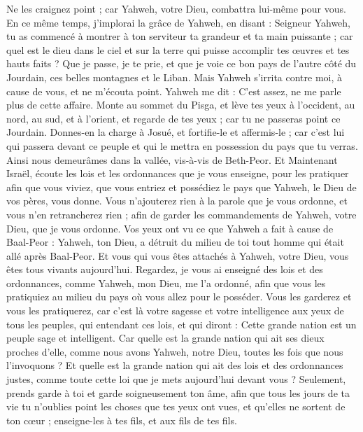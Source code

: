 \begin{multicols}{2}
Ne les craignez point ; car Yahweh, votre Dieu, combattra lui-même pour vous.
En ce même temps, j’implorai la grâce de Yahweh, en disant :
Seigneur Yahweh, tu as commencé à montrer à ton serviteur ta grandeur et ta main puissante ; car quel est le dieu dans le ciel et sur la terre qui puisse accomplir tes œuvres et tes hauts faits ?
Que je passe, je te prie, et que je voie ce bon pays de l’autre côté du Jourdain, ces belles montagnes et le Liban.
Mais Yahweh s’irrita contre moi, à cause de vous, et ne m'écouta point. Yahweh me dit : C'est assez, ne me parle plus de cette affaire.
Monte au sommet du Pisga, et lève tes yeux à l'occident, au nord, au sud, et à l'orient, et regarde de tes yeux ; car tu ne passeras point ce Jourdain.
Donnes-en la charge à Josué, et fortifie-le et affermis-le ; car c'est lui qui passera devant ce peuple et qui le mettra en possession du pays que tu verras.
Ainsi nous demeurâmes dans la vallée, vis-à-vis de Beth-Peor.
\VerseOne{}Et Maintenant Israël, écoute les lois et les ordonnances que je vous enseigne, pour les pratiquer afin que vous viviez, que vous entriez et possédiez le pays que Yahweh, le Dieu de vos pères, vous donne.
Vous n'ajouterez rien à la parole que je vous ordonne, et vous n'en retrancherez rien ; afin de garder les commandements de Yahweh, votre Dieu, que je vous ordonne.
Vos yeux ont vu ce que Yahweh a fait à cause de Baal-Peor : Yahweh, ton Dieu, a détruit du milieu de toi tout homme qui était allé après Baal-Peor.
Et vous qui vous êtes attachés à Yahweh, votre Dieu, vous êtes tous vivants aujourd'hui.
Regardez, je vous ai enseigné des lois et des ordonnances, comme Yahweh, mon Dieu, me l'a ordonné, afin que vous les pratiquiez au milieu du pays où vous allez pour le posséder.
Vous les garderez et vous les pratiquerez, car c'est là votre sagesse et votre intelligence aux yeux de tous les peuples, qui entendant ces lois, et qui diront : Cette grande nation est un peuple sage et intelligent.
Car quelle est la grande nation qui ait ses dieux proches d’elle, comme nous avons Yahweh, notre Dieu, toutes les fois que nous l’invoquons ?
Et quelle est la grande nation qui ait des lois et des ordonnances justes, comme toute cette loi que je mets aujourd'hui devant vous ?
Seulement, prends garde à toi et garde soigneusement ton âme, afin que tous les jours de ta vie tu n'oublies point les choses que tes yeux ont vues, et qu’elles ne sortent de ton cœur ; enseigne-les à tes fils, et aux fils de tes fils.

\end{multicols}
